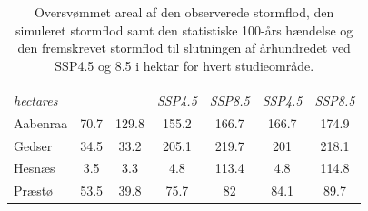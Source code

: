 \begin{table}[H]
	\centering
	\renewcommand{\arraystretch}{1.2} 
	\begin{threeparttable}
		\caption{Oversvømmet areal af den observerede stormflod, den simuleret stormflod samt den statistiske 100-års hændelse og den fremskrevet stormflod til slutningen af århundredet ved SSP4.5 og 8.5 i hektar for hvert studieområde.}
		\begin{tabular}{@{} l S[table-format=3.1, output-decimal-marker={.}] 
				S[table-format=3.1, output-decimal-marker={.}] 
				S[table-format=3.1, output-decimal-marker={.}] 
				S[table-format=3.1, output-decimal-marker={.}] 
				S[table-format=3.1, output-decimal-marker={.}] 
				S[table-format=3.1, output-decimal-marker={.}] @{}} 
			\toprule
			&  
			&  
			&  
			&  \\ 
			\cmidrule(l){4-5} \cmidrule(l){6-7}
			{\textit{hectares}} & & & {\textit{SSP4.5}} & {\textit{SSP8.5}} & {\textit{SSP4.5}} & {\textit{SSP8.5}} \\
			\midrule
			Aabenraa & 70.7 & 129.8 & 155.2 & 166.7 & 166.7 & 174.9 \\
			Gedser & 34.5 & 33.2 & 205.1 & 219.7 & 201 & 218.1 \\ 
			Hesnæs & 3.5 & 3.3 & 4.8 & 113.4 & 4.8 & 114.8 \\
			Præstø & 53.5 & 39.8 & 75.7 & 82 & 84.1 & 89.7 \\
			\bottomrule
		\end{tabular}
		\label{Tabel: Oversvømmet arealer af stormfloder}
	\end{threeparttable}
\end{table}